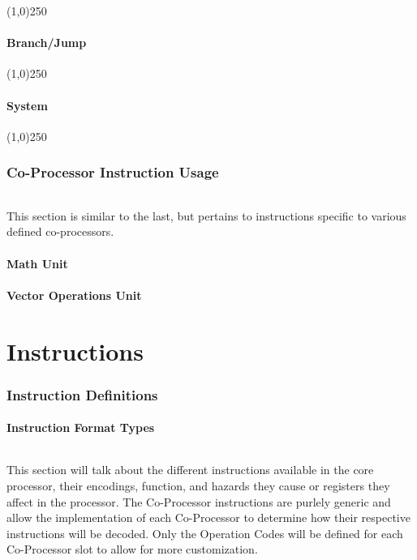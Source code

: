 \documentclass[letterpaper, 11pt]{article}
\begin{document}
\begin{center}
	\line(1,0){250}
\end{center}
\subsection{Branch/Jump}

\begin{center}
	\line(1,0){250}
\end{center}
\subsection{System}

\begin{center}
	\line(1,0){250}
\end{center}
\clearpage
\section{Co-Processor Instruction Usage}
\paragraph{}This section is similar to the last, but pertains to instructions specific to various defined co-processors.
\subsection{Math Unit}
\subsection{Vector Operations Unit}
\subsection{}
\clearpage

\part{Instructions}
\section{Instruction Definitions}
\subsection{Instruction Format Types}
\paragraph{}This section will talk about the different instructions available in the core processor, their encodings, function, and hazards
they cause or registers they affect in the processor. The Co-Processor instructions are purlely generic and allow the implementation of
each Co-Processor to determine how their respective instructions will be decoded. Only the Operation Codes will be defined for each 
Co-Processor slot to allow for more customization.
\end{document}
